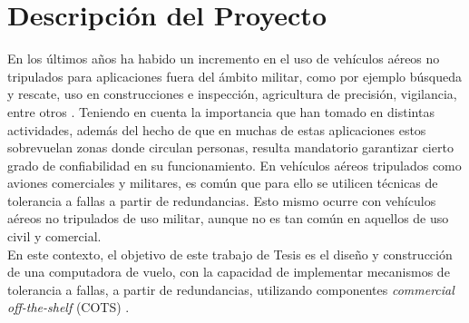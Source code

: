 \section{Descripción del Proyecto}





En los últimos años ha habido un incremento en el uso de vehículos aéreos no tripulados para aplicaciones fuera del ámbito militar, como por ejemplo búsqueda y rescate, uso en construcciones e inspección, agricultura de precisión, vigilancia, entre otros \cite{8682048}. Teniendo en cuenta la importancia que han tomado en distintas actividades, además del hecho de que en muchas de estas aplicaciones estos sobrevuelan zonas donde circulan personas, resulta mandatorio garantizar cierto grado de confiabilidad en su funcionamiento. En vehículos aéreos tripulados como aviones comerciales y militares, es común que para ello se utilicen técnicas de tolerancia a fallas a partir de redundancias. Esto mismo ocurre con vehículos aéreos no tripulados de uso militar, aunque no es tan común en aquellos de uso civil y comercial.\\

En este contexto, el objetivo de este trabajo de Tesis es el diseño y construcción de una computadora de vuelo, con la capacidad de implementar mecanismos de tolerancia a fallas, a partir de redundancias, utilizando componentes \textit{commercial off-the-shelf} (COTS) \cite[p.~26]{EASAcots}.